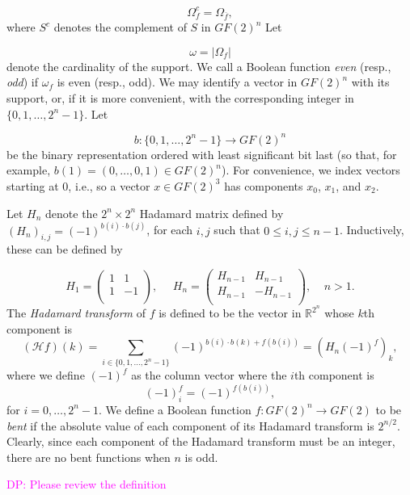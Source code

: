 \documentclass[12pt]{article}
\def\magenta#1{\textcolor{magenta}{#1}}
\newcommand{\djp}[1]{\magenta{DP: #1}}
\newcommand{\djp}[1]{}
\def\rrr{\mathbb{R}}
\def\zzz{\mathbb{Z}}
\newcommand{\Hcal}{{\mathcal{H}}}
\newcommand{\onef}{(-1)^f}
\begin{document}
\[
\Omega_f^c=\Omega_{\overline{f}},
\]
where $S^c$ denotes the complement of $S$ in $GF(2)^n$
Let

\[
\omega=|\Omega_f|
\]
denote the cardinality of the support.
We call a Boolean function {\it even} (resp., {\it odd}) if
$\omega_f$ is even (resp., odd).
We may identify a vector in $GF(2)^n$ with its support, or,
if it is more convenient, with the corresponding integer in
$\{0,1, \dots, 2^n-1\}.$ Let

\[
b:\{0,1, \dots, 2^n-1\} \to GF(2)^n
\]
be the binary representation ordered with least significant
bit last (so that, for example, $b(1)=(0,\dots, 0, 1)\in GF(2)^n$).
For convenience, we index vectors starting at 0, i.e., so a vector $x
\in GF(2)^3$ has components $x_0$, $x_1$, and $x_2$.



Let $H_n$ denote the $2^n\times 2^n$ Hadamard matrix
defined by $(H_n)_{i,j} = (-1)^{b(i)\cdot b(j)}$, for each $i,j$
such that $0\leq i,j\leq n-1$. Inductively, these can be defined by

\[
H_1 =
\left(
\begin{array}{cc}
1 & 1\\
1 & -1 \\
\end{array}
\right),
\ \ \ \ \ \
H_n =
\left(
\begin{array}{cc}
H_{n-1} & H_{n-1}\\
H_{n-1} & -H_{n-1} \\
\end{array}
\right),
\ \ \ \ \
n>1.
\]
The {\it Hadamard transform} of $f$ is defined to be
the vector in $\rrr^{2^n}$ whose $k$th component is
\[
(\Hcal f)(k) = \sum_{i \in \{0,1,\ldots,2^n-1\}}(-1)^{b(i) \cdot b(k) + f(b(i))} =
(H_n \onef)_k,
\]
where we define $\onef$ as the column vector where the $i$th
component is
\[
\onef_i = (-1)^{f(b(i))},
\]
for $i = 0,\ldots,2^n-1$.
We define a Boolean function
$f:GF(2)^n\to GF(2)$ to be {\it bent} if the absolute value of each
component of its
Hadamard transform is $2^{n/2}$. Clearly, since each component of the Hadamard
transform must be an integer, there are no bent functions
when $n$ is odd.

\djp{Please review the definition}
\end{document}
